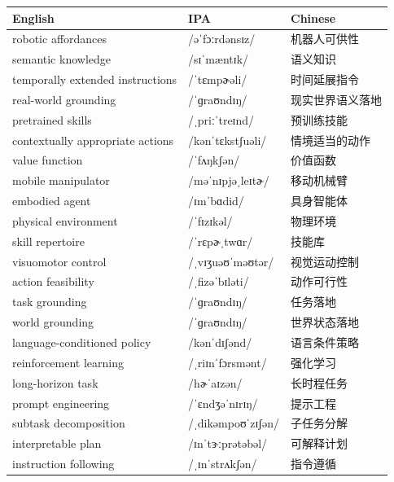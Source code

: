 \documentclass[UTF8,12pt,a4paper]{ctexart}
\providecommand{\zh}[1]{#1}
\begin{document}
\begin{tabular*}{\textwidth}{@{\extracolsep{\fill}}lll@{}}
\toprule
\textbf{English} & \textbf{IPA} & \textbf{Chinese} \\
\midrule
robotic affordances & {\ipafont /əˈfɔːrdənsɪz/} & \zh{机器人可供性} \\
semantic knowledge & {\ipafont /sɪˈmæntɪk/} & \zh{语义知识} \\
temporally extended instructions & {\ipafont /ˈtɛmpɚəli/} & \zh{时间延展指令} \\
real-world grounding & {\ipafont /ˈɡraʊndɪŋ/} & \zh{现实世界语义落地} \\
pretrained skills & {\ipafont /ˌpriːˈtreɪnd/} & \zh{预训练技能} \\
contextually appropriate actions & {\ipafont /kənˈtɛkstʃuəli/} & \zh{情境适当的动作} \\
value function & {\ipafont /ˈfʌŋkʃən/} & \zh{价值函数} \\
mobile manipulator & {\ipafont /məˈnɪpjəˌleɪtɚ/} & \zh{移动机械臂} \\
embodied agent & {\ipafont /ɪmˈbɑdid/} & \zh{具身智能体} \\
physical environment & {\ipafont /ˈfɪzɪkəl/} & \zh{物理环境} \\
skill repertoire & {\ipafont /ˈrɛpɚˌtwɑr/} & \zh{技能库} \\
visuomotor control & {\ipafont /ˌvɪʒuəʊˈməʊtər/} & \zh{视觉运动控制} \\
action feasibility & {\ipafont /ˌfizəˈbɪləti/} & \zh{动作可行性} \\
task grounding & {\ipafont /ˈɡraʊndɪŋ/} & \zh{任务落地} \\
world grounding & {\ipafont /ˈɡraʊndɪŋ/} & \zh{世界状态落地} \\
language-conditioned policy & {\ipafont /kənˈdɪʃənd/} & \zh{语言条件策略} \\
reinforcement learning & {\ipafont /ˌriɪnˈfɔrsmənt/} & \zh{强化学习} \\
long-horizon task & {\ipafont /hɚˈaɪzən/} & \zh{长时程任务} \\
prompt engineering & {\ipafont /ˈɛndʒəˈnɪrɪŋ/} & \zh{提示工程} \\
subtask decomposition & {\ipafont /ˌdikəmpoʊˈzɪʃən/} & \zh{子任务分解} \\
interpretable plan & {\ipafont /ɪnˈtɝːprətəbəl/} & \zh{可解释计划} \\
instruction following & {\ipafont /ˌɪnˈstrʌkʃən/} & \zh{指令遵循} \\

\end{tabular*}
\end{document}
